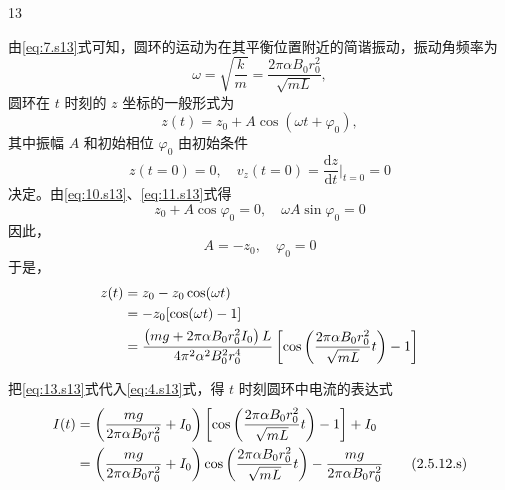 \begin{solution}{13}
\begin{subsolution}
由\eqref{eq:7.s13}式可知，圆环的运动为在其平衡位置附近的简谐振动，振动角频率为
\begin{equation}
\omega = \sqrt {\frac {k}{m}} = \frac {2 \pi \alpha B _ {0} r _ {0} ^ {2}}{\sqrt {m L}},
\label{eq:9.s13}
\end{equation}
圆环在 $t$ 时刻的 $z$ 坐标的一般形式为
\begin{equation}
z (t) = z _ {0} + A \cos (\omega t + \varphi_ {0}),
\label{eq:10.s13}
\end{equation}
其中振幅 $A$ 和初始相位 $\varphi_{0}$ 由初始条件
\begin{equation}
z (t = 0) = 0, \quad v _ {z} (t = 0) = \frac {\mathrm{d} z}{\mathrm{d} t} \Bigg | _ {t = 0} = 0
\label{eq:11.s13}
\end{equation}
决定。由\eqref{eq:10.s13}、\eqref{eq:11.s13}式得
\begin{equation*}
z _ {0} + A \cos \varphi_ {0} = 0, \quad \omega A \sin \varphi_ {0} = 0
\end{equation*}
因此，
\begin{equation}
A = - z _ {0}, \quad \varphi_ {0} = 0
\label{eq:12.s13}
\end{equation}
于是，
\begin{align}
z (t) &= z _ {0} - z _ {0} \cos (\omega t) \notag \\
&= - z _ {0} [ \cos (\omega t) - 1 ] \notag \\
&= \frac {\left(m g + 2 \pi \alpha B _ {0} r _ {0} ^ {2} I _ {0}\right) L}{4 \pi^ {2} \alpha^ {2} B _ {0} ^ {2} r _ {0} ^ {4}} \left[ \cos \left(\frac {2 \pi \alpha B _ {0} r _ {0} ^ {2}}{\sqrt {m L}} t\right) - 1 \right]
\label{eq:13.s13}
\end{align}
\end{subsolution}

\begin{subsolution}
把\eqref{eq:13.s13}式代入\eqref{eq:4.s13}式，得 $t$ 时刻圆环中电流的表达式
\begin{align}
I (t) &= \left(\frac {m g}{2 \pi \alpha B _ {0} r _ {0} ^ {2}} + I _ {0}\right) \left[ \cos \left(\frac {2 \pi \alpha B _ {0} r _ {0} ^ {2}}{\sqrt {m L}} t\right) - 1 \right] + I _ {0} \notag \\
&= \left(\frac {m g}{2 \pi \alpha B _ {0} r _ {0} ^ {2}} + I _ {0}\right) \cos \left(\frac {2 \pi \alpha B _ {0} r _ {0} ^ {2}}{\sqrt {m L}} t\right) - \frac {m g}{2 \pi \alpha B _ {0} r _ {0} ^ {2}}
\tag{2.5.12.s}
\label{eq:14.s13}
\end{align}
\end{subsolution}
\end{solution}